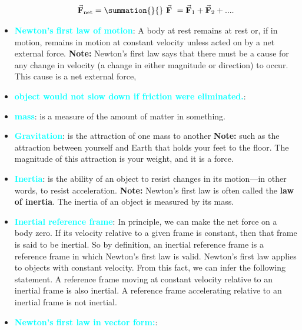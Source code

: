 \documentclass{report}
\begin{document}
\begin{itemize}
                \begin{align*}
                    \vec{\mathbf{F}}_{\text{net}} = \summation{}{}\  \vec{\mathbf{F}}\ = \vec{\mathbf{F}}_{1} + \vec{\mathbf{F}}_{2} + ...
                .\end{align*}
            \item \textbf{\textcolor{cyan}{Newton's first law of motion}}: A body at rest remains at rest or, if in motion, remains in motion at constant velocity unless acted on by a net external force.
                \bigbreak \noindent 
                \textbf{Note:} Newton’s first law says that there must be a cause for any change in velocity (a change in either magnitude or direction) to occur. This cause is a net external force,
            \item \textbf{\textcolor{cyan}{object would not slow down if friction were eliminated.}}:
            \item \textbf{\textcolor{cyan}{mass}}: is a measure of the amount of matter in something.
            \item \textbf{\textcolor{cyan}{Gravitation}}: is the attraction of one mass to another
                \bigbreak \noindent 
                \textbf{Note:} such as the attraction between yourself and Earth that holds your feet to the floor. The magnitude of this attraction is your weight, and it is a force.
            \item \textbf{\textcolor{cyan}{Inertia}}: is the ability of an object to resist changes in its motion—in other words, to resist acceleration.
                \bigbreak \noindent 
                \textbf{Note:} Newton’s first law is often called the \textbf{law of inertia}. The inertia of an object is measured by its mass.
            \item \textbf{\textcolor{cyan}{Inertial reference frame}}: In principle, we can make the net force on a body zero. If its velocity relative to a given frame is constant, then that frame is said to be inertial.
                \bigbreak \noindent 
                So by definition, an inertial reference frame is a reference frame in which Newton’s first law is valid. Newton’s first law applies to objects with constant velocity. From this fact, we can infer the following statement.
                \bigbreak \noindent 
                A reference frame moving at constant velocity relative to an inertial frame is also inertial. A reference frame accelerating relative to an inertial frame is not inertial.
            \item \textbf{\textcolor{cyan}{Newton’s first law in vector form:}}:

\end{itemize}
\end{document}
